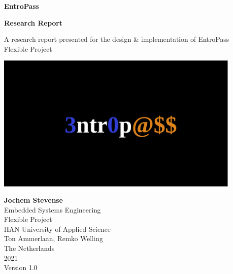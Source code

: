 \documentclass[a4paper,12pt]{article}
\begin{document}
\begin{titlepage}
  \begin{center}
    \vspace*{1cm}

    \Huge
    \textbf{EntroPass}

    \vspace{0.5cm}
    \LARGE
    \textbf{Research Report}


    \Large
    A research report presented for the design \& implementation of EntroPass\\
    \normalsize
    Flexible Project

    \vspace{0.8cm}

    \includegraphics[width=0.9\textwidth]{entropass}

  \end{center}
  \vfill  
  \vspace{1.5cm}

  \textbf{Jochem Stevense}\\
  \normalsize
  Embedded Systems Engineering\\
  Flexible Project\\
  HAN University of Applied Science\\
  Ton Ammerlaan, Remko Welling\\
  The Netherlands\\
  2021\\
  Version 1.0
\end{titlepage}
\end{document}
